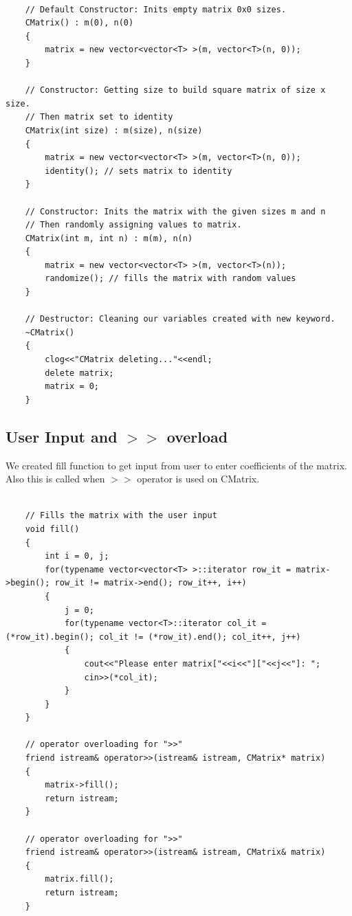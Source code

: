\documentclass{article}
\begin{document}
	\begin{lstlisting}[label=CMatrixConstructors, caption=CMatrix Constructors]
	
    // Default Constructor: Inits empty matrix 0x0 sizes.
    CMatrix() : m(0), n(0)
    {
        matrix = new vector<vector<T> >(m, vector<T>(n, 0));
    }

    // Constructor: Getting size to build square matrix of size x size.
    // Then matrix set to identity
    CMatrix(int size) : m(size), n(size)
    {
        matrix = new vector<vector<T> >(m, vector<T>(n, 0));
        identity(); // sets matrix to identity
    }

    // Constructor: Inits the matrix with the given sizes m and n
    // Then randomly assigning values to matrix.
    CMatrix(int m, int n) : m(m), n(n)
    {
        matrix = new vector<vector<T> >(m, vector<T>(n));
        randomize(); // fills the matrix with random values
    }
    
    // Destructor: Cleaning our variables created with new keyword.
    ~CMatrix()
    {
        clog<<"CMatrix deleting..."<<endl;
        delete matrix;
        matrix = 0;
    }

	\end{lstlisting}
	
	
	\subsection{User Input and $>>$ overload}
	We created fill function to get input from user to enter coefficients of the matrix. Also this is called when $>>$ operator is used on CMatrix.
	
	\begin{lstlisting}[label=CMatrixInput, caption=CMatrix Input]
	
    // Fills the matrix with the user input
    void fill()
    {
        int i = 0, j;
        for(typename vector<vector<T> >::iterator row_it = matrix->begin(); row_it != matrix->end(); row_it++, i++)
        {
            j = 0;
            for(typename vector<T>::iterator col_it = (*row_it).begin(); col_it != (*row_it).end(); col_it++, j++)
            {
                cout<<"Please enter matrix["<<i<<"]["<<j<<"]: ";
                cin>>(*col_it);
            }
        }
    }

    // operator overloading for ">>"
    friend istream& operator>>(istream& istream, CMatrix* matrix)
    {
        matrix->fill();
        return istream;
    }

    // operator overloading for ">>"
    friend istream& operator>>(istream& istream, CMatrix& matrix)
    {
        matrix.fill();
        return istream;
    }
	\end{lstlisting}
	
\end{document}
